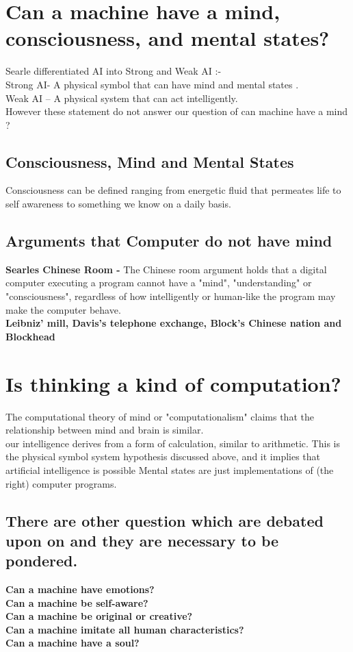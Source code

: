 \documentclass{article}
\begin{document}
\section{Can a machine have a mind, consciousness, and mental states?}
Searle differentiated AI into Strong and Weak AI :- \\ 
Strong AI- A physical symbol that can have mind and mental states .\\
Weak AI – A physical system that can act intelligently. \\
However these statement do not answer our question of can machine have a mind ? \\
\subsection{Consciousness, Mind and Mental States }
Consciousness can be defined ranging from  energetic fluid that permeates life to self awareness to something we know on a daily basis. \\
\subsection{Arguments that Computer do not have mind }
\textbf {Searles Chinese Room - }The Chinese room argument holds that a digital computer executing a program cannot have a "mind", "understanding" or "consciousness", regardless of how intelligently or human-like the program may make the computer behave.\\
 \textbf {Leibniz' mill, Davis's telephone exchange, Block's Chinese nation and Blockhead} \\

\section{Is thinking a kind of computation?}
The computational theory of mind or "computationalism" claims that the relationship between mind and brain is similar. \\
our intelligence derives from a form of calculation, similar to arithmetic. This is the physical symbol system hypothesis discussed above, and it implies that artificial intelligence is possible
Mental states are just implementations of (the right) computer programs. \\

\subsection{There are other question which are debated upon on and they are necessary to be pondered. }
\textbf {Can a machine have emotions?\\
Can a machine be self-aware?\\
Can a machine be original or creative?\\
Can a machine imitate all human characteristics?\\
Can a machine have a soul?\\}
\end{document}

